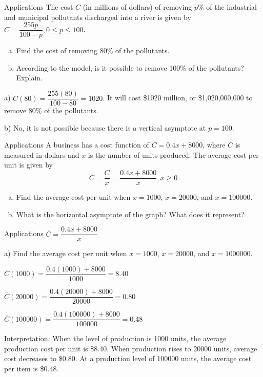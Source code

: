 \documentclass[t]{beamer}
\begin{document}
	\begin{frame}{Applications}
		The cost $C$ (in millions of dollars) of removing $p\%$ of the industrial and municipal pollutants discharged into a river is given by $C = \dfrac{255p}{100-p}, 0\leq p \leq 100$. \begin{enumerate}[a)]
			\item Find the cost of removing 80\% of the pollutants.
			\item According to the model, is it possible to remove 100\% of the pollutants? Explain.
		\end{enumerate} \pause
	
		a) $C(80) = \dfrac{255(80)}{100 - 80} = 1020$. It will cost \$1020 million, or \$1,020,000,000 to remove 80\% of the pollutants. \pause
		
		b) No, it is not possible because there is a vertical asymptote at $p = 100$.
	\end{frame}

	\begin{frame}{Applications}
		A business has a cost function of $C = 0.4x + 8000$, where $C$ is measured in dollars and $x$ is the number of units produced. The average cost per unit is given by $$\overline{C} = \dfrac{C}{x} = \dfrac{0.4x + 8000}{x}, x\geq 0$$ \begin{enumerate}[a)]
			\item Find the average cost per unit when $x = 1000$, $x = 20000$, and $x = 100000$.
			\item What is the horizontal asymptote of the graph? What does it represent?
		\end{enumerate}
	\end{frame}

	\begin{frame}{Applications}
		$\overline{C} = \dfrac{0.4x + 8000}{x}$
		
		a) Find the average cost per unit when $x = 1000$, $x = 20000$, and $x = 1000000$. \pause
		
		$\overline{C}(1000) = \dfrac{0.4(1000) + 8000}{1000} = 8.40$ \pause
		
		$\overline{C}(20000) = \dfrac{0.4(20000) + 8000}{20000} = 0.80$ \pause
		
		$\overline{C}(100000) = \dfrac{0.4(100000) + 8000}{100000} = 0.48$ \pause
		
		Interpretation: When the level of production is 1000 units, the average production cost per unit is \$8.40. When production rises to 20000 units, average cost decreases to \$0.80. At a production level of 100000 units, the average cost per item is \$0.48.
	\end{frame}
\end{document}
